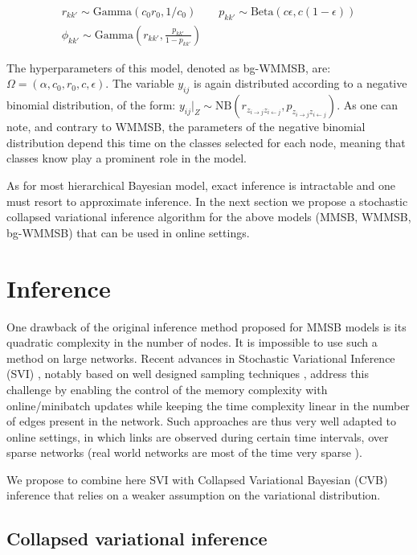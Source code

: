 \begin{gather*}
r_{kk'} \sim \textrm{Gamma}(c_0r_0, 1/c_0) \qquad p_{kk'} \sim \textrm{Beta}(c\epsilon, c(1-\epsilon)) \\
\phi_{kk'} \sim \textrm{Gamma}(r_{kk'}, \frac{p_{kk'}}{1-p_{kk'}})
\end{gather*}

The hyperparameters of this model, denoted as bg-WMMSB, are: $\Omega = (\alpha, c_0, r_0, c, \epsilon)$. The variable $y_{ij}$ is again distributed according to a negative binomial distribution, of the form: $y_{ij}|_{Z} \sim \textrm{NB}(r_{z_{i \rightarrow j} z_{i \leftarrow j}},p_{z_{i \rightarrow j} z_{i \leftarrow j}})$. As one can note, and contrary to WMMSB, the parameters of the negative binomial distribution depend this time on the classes selected for each node, meaning that classes know play a prominent role in the model.

As for most hierarchical Bayesian model, exact inference is intractable and one must resort to approximate inference. In the next section we propose a stochastic collapsed variational inference algorithm for the above models (MMSB, WMMSB, bg-WMMSB) that can be used in online settings.

\section{Inference}

One drawback of the original inference method proposed for MMSB models is its quadratic complexity in the number of nodes. It is impossible to use such a method on large networks. Recent advances in Stochastic Variational Inference (SVI) \cite{hoffman2013stochastic}, notably based on well designed sampling techniques \cite{gopalan2013efficient,kim2013efficient}, address this challenge by enabling the control of the memory complexity with online/minibatch updates while keeping the time complexity linear in the number of edges present in the network. Such approaches are thus very well adapted to online settings, in which links are observed during certain time intervals, over sparse networks (real world networks are most of the time very sparse \cite{barabasi_burst}).

We propose to combine here SVI with Collapsed Variational Bayesian (CVB) inference \cite{teh2006collapsed} that relies on a weaker assumption on the variational distribution.

\subsection{Collapsed variational inference}

